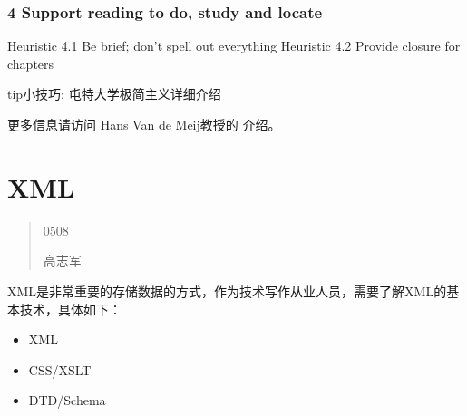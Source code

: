 \documentclass[letterpaper,10pt,english]{sphinxmanual}
\begin{document}
\subsection{4 Support reading to do, study and locate}
\label{\detokenize{design/minimalism:support-reading-to-do-study-and-locate}}
\sphinxAtStartPar
Heuristic 4.1 Be brief; don’t spell out everything
Heuristic 4.2 Provide closure for chapters

\begin{sphinxadmonition}{tip}{小技巧:}
\sphinxAtStartPar
屯特大学极简主义详细介绍

\sphinxAtStartPar
更多信息请访问 Hans Van de Meij教授的  介绍。
\end{sphinxadmonition}

\sphinxstepscope


\chapter{XML}
\label{\detokenize{XML/xml:xml}}\label{\detokenize{XML/xml::doc}}\begin{quote}\begin{description}
\sphinxhyphen{}05\sphinxhyphen{}08

\sphinxAtStartPar
高志军

\end{description}\end{quote}

\sphinxAtStartPar
XML是非常重要的存储数据的方式，作为技术写作从业人员，需要了解XML的基本技术，具体如下：
\begin{itemize}
\item {} 
\sphinxAtStartPar
XML

\item {} 
\sphinxAtStartPar
CSS/XSLT

\item {} 
\sphinxAtStartPar
DTD/Schema

\end{itemize}
\end{document}
